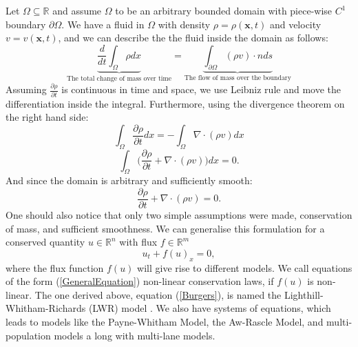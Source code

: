 \documentclass[10pt]{article}
\numberwithin{equation}{section}
\begin{document}
Let $\Omega \subseteq \mathbb{R}$ and assume $\Omega$ to be an arbitrary bounded domain with piece-wise $C^1$ boundary $\partial \Omega$. We have a fluid in $\Omega$ with density $\rho = \rho(\boldsymbol{x}, t)$ and velocity $v = v(\boldsymbol x, t)$, and we can describe the the fluid inside the domain as follows:
\begin{equation*}
    \underbrace{\frac{d}{dt} \int_{\Omega} \rho dx }_{ \text{The total change of mass over time}}  = \underbrace{\int_{\partial \Omega} (\rho v) \cdot n ds }_{\text{The flow of mass over the boundary}}
\end{equation*}
Assuming $\frac{\partial \rho}{\partial t}$ is continuous in time and space, we use Leibniz rule and move the differentiation inside the integral. Furthermore, using the divergence theorem on the right hand side: 
\begin{equation*}
    \int_{\Omega} \frac{\partial \rho}{\partial t} dx   = - \int_{\Omega} \nabla \cdot (\rho v)dx 
\end{equation*}
\begin{equation*}
    \int_{\Omega} \big ( \frac{\partial \rho}{\partial t}  + \nabla \cdot (\rho v) \big ) dx   = 0.
\end{equation*}
And since the domain is arbitrary and sufficiently smooth: 
\begin{equation}
    \frac{\partial \rho}{\partial t}  + \nabla \cdot (\rho v) = 0.
\label{Burgers}
\end{equation}
One should also notice that only two simple assumptions were made, conservation of mass, and sufficient smoothness. We can generalise this formulation for a conserved quantity $u \in \mathbb{R}^n$ with flux $ f \in \mathbb{R}^m$ 
\begin{equation}
    u_t + f(u)_x = 0, 
    \label{GeneralEquation}
\end{equation}
where the flux function $f(u)$ will give rise to different models. We call equations of the form (\ref{GeneralEquation}) non-linear conservation laws, if $f(u)$ is non-linear. The one derived above, equation (\ref{Burgers}), is named the Lighthill-Whitham-Richards (LWR) model \cite{LWROrig}. We also have systems of equations, which leads to models like the Payne-Whitham Model, the Aw-Rascle Model, and multi-population models a long with multi-lane models. 
\end{document}
